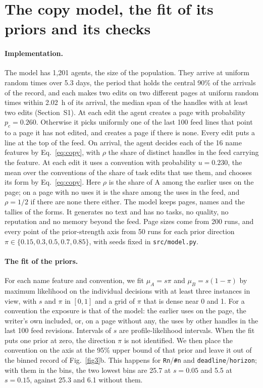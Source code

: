 \documentclass[10pt]{article}
\begin{document}
\clearpage
\section{The copy model, the fit of its priors and its checks}\label{sec:model}

\paragraph{Implementation.} The model has 1,201 agents, the size of the population. They arrive at uniform random times over 5.3 days, the period that holds the central 90\% of the arrivals of the record, and each makes two edits on two different pages at uniform random times within 2.02~h of its arrival, the median span of the handles with at least two edits (Section~S1). At each edit the agent creates a page with probability $p_c=0.260$. Otherwise it picks uniformly one of the last 100 feed lines that point to a page it has not edited, and creates a page if there is none. Every edit puts a line at the top of the feed. On arrival, the agent decides each of the 16 name features by Eq.~\eqref{eq:copy}, with $\rho$ the share of distinct handles in the feed carrying the feature. At each edit it uses a convention with probability $u=0.230$, the mean over the conventions of the share of task edits that use them, and chooses its form by Eq.~\eqref{eq:copy}. Here $\rho$ is the share of A among the earlier uses on the page; on a page with no uses it is the share among the uses in the feed, and $\rho=1/2$ if there are none there either. The model keeps pages, names and the tallies of the forms. It generates no text and has no tasks, no quality, no reputation and no memory beyond the feed. Page sizes come from 200 runs, and every point of the prior-strength axis from 50 runs for each prior direction $\pi\in\{0.15, 0.3, 0.5, 0.7, 0.85\}$, with seeds fixed in \texttt{src/model.py}.

\paragraph{The fit of the priors.} For each name feature and convention, we fit $\mu_A=s\pi$ and $\mu_B=s(1-\pi)$ by maximum likelihood on the individual decisions with at least three instances in view, with $s$ and $\pi$ in $[0,1]$ and a grid of $\pi$ that is dense near 0 and 1. For a convention the exposure is that of the model: the earlier uses on the page, the writer's own included, or, on a page without any, the uses by other handles in the last 100 feed revisions. Intervals of $s$ are profile-likelihood intervals. When the fit puts one prior at zero, the direction $\pi$ is not identified. We then place the convention on the axis at the 95\% upper bound of that prior and leave it out of the binned record of Fig.~\ref{fig3}b. This happens for \texttt{Rn}/\texttt{\#n} and \texttt{deadline}/\texttt{horizon}; with them in the bins, the two lowest bins are 25.7 at $s=0.05$ and 5.5 at $s=0.15$, against 25.3 and 6.1 without them.
\end{document}
